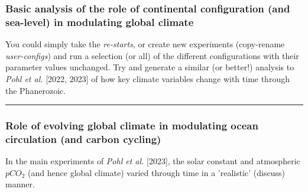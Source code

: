 \newpage

\subsubsection{Basic analysis of the role of continental configuration (and sea-level) in modulating global climate}

\vspace{2mm}
You could simply take the \textit{re-starts}, or create new experiments (copy-rename \textit{user-configs}) and run a selection (or all) of the different configurations with their parameter values unchanged. Try and generate a similar (or better!) analysis to \textit{Pohl et al.} [2022, 2023] of how key climate variables change with time through the Phanerozoic.

\vspace{1mm}\noindent\rule{4cm}{0.5pt}\vspace{2mm}

\subsubsection{Role of evolving global climate in modulating ocean circulation (and carbon cycling)}

\vspace{2mm}
In the main experiments of \textit{Pohl et al.} [2023], the solar constant and atmospheric $pCO_{2}$ (and hence global climate) varied through time in a 'realistic' (discuss) manner.

